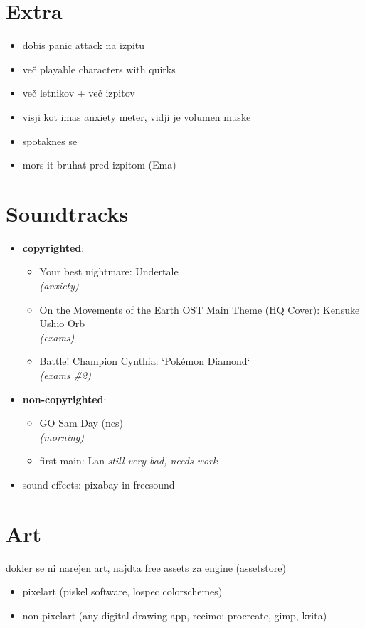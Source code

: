 \documentclass[a4paper]{article}
\begin{document}
\section{Extra}
\begin{itemize}
    \item dobis panic attack na izpitu
    \item več playable characters with quirks
    \item več letnikov + več izpitov
    \item visji kot imas anxiety meter, vidji je volumen muske
    \item spotaknes se
    \item mors it bruhat pred izpitom (Ema)
\end{itemize}

\section{Soundtracks}
\begin{itemize}
    \item \textbf{copyrighted}: \begin{itemize}
        \item Your best nightmare: Undertale \\
        \textsl{(anxiety)}
        \item On the Movements of the Earth OST \- Main Theme (HQ Cover): Kensuke Ushio Orb \\
        \textsl{(exams)}
        \item Battle! Champion Cynthia: `Pokémon Diamond`\\
        \textsl{(exams \#2)}
    \end{itemize}
    
    \item \textbf{non-copyrighted}: \begin{itemize}
        \item GO\: Sam Day (ncs) \\
        \textsl{(morning)}
        \item first-main: Lan
        \textsl{still very bad, needs work}
    \end{itemize}
    \item sound effects: pixabay in freesound
\end{itemize}

\section{Art}
dokler se ni narejen art, najdta free assets za engine (assetstore)
\begin{itemize}
    \item pixelart (piskel \- software, lospec \- colorschemes)
    \item non-pixelart (any digital drawing app, recimo: procreate, gimp, krita)
\end{itemize}
\end{document}
